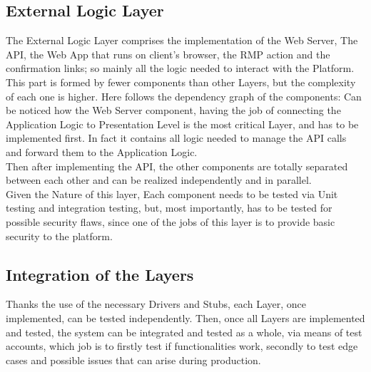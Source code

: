 \subsection{External Logic Layer}
The External Logic Layer comprises the implementation of the Web Server, The API, the Web App that runs on client's browser, the RMP action and the confirmation links; so mainly all the logic needed to interact with the Platform.\\
This part is formed by fewer components than other Layers, but the complexity of each one is higher. Here follows the dependency graph of the components:
Can be noticed how the Web Server component, having the job of connecting the Application Logic to Presentation Level is the most critical Layer, and has to be implemented first. In fact it contains all logic needed to manage the API calls and forward them to the Application Logic.\\
Then after implementing the API, the other components are totally separated between each other and can be realized independently and in parallel.\\   
Given the Nature of this layer, Each component needs to be tested via Unit testing and integration testing, but, most importantly, has to be tested for possible security flaws, since one of the jobs of this layer is to provide basic security to the platform. \\

\subsection{Integration of the Layers}
Thanks the use of the necessary Drivers and Stubs, each Layer, once implemented, can be tested independently. 
Then, once all Layers are implemented and tested, the system can be integrated and tested as a whole, via means of test accounts, which job is to firstly test if functionalities work, secondly to test edge cases and possible issues that can arise during production.\\